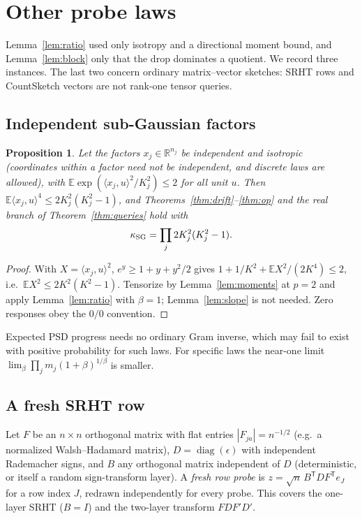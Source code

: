 \documentclass[11pt,a4paper]{article}
\newtheorem{proposition}[theorem]{Proposition}
\theoremstyle{definition}\newtheorem{definition}[theorem]{Definition}
\theoremstyle{remark}\newtheorem{remark}[theorem]{Remark}
\numberwithin{equation}{section}
\newcommand{\E}{\mathbb E}
\newcommand{\R}{\mathbb R}
\newcommand{\diag}{\operatorname{diag}}
\begin{document}
\section{Other probe laws}\label{sec:otherlaws}
Lemma~\ref{lem:ratio} used only isotropy and a directional moment bound, and
Lemma~\ref{lem:block} only that the drop dominates a quotient. We record three
instances. The last two concern ordinary matrix--vector sketches: SRHT rows and
CountSketch vectors are not rank-one tensor queries.

\subsection{Independent sub-Gaussian factors}
\begin{proposition}\label{prop:subgauss}
Let the factors $x_j\in\R^{n_j}$ be independent and isotropic (coordinates within
a factor need not be independent, and discrete laws are allowed), with
$\E\exp(\langle x_j,u\rangle^2/K_j^2)\le2$ for all unit $u$. Then
$\E\langle x_j,u\rangle^4\le2K_j^2(K_j^2-1)$, and Theorems~\ref{thm:drift}--\ref{thm:op}
and the real branch of Theorem~\ref{thm:queries} hold with
\[
 \kappa_{\rm SG}=\prod_j2K_j^2(K_j^2-1).
\]
\end{proposition}
\begin{proof}
With $X=\langle x_j,u\rangle^2$, $e^y\ge1+y+y^2/2$ gives
$1+1/K^2+\E X^2/(2K^4)\le2$, i.e.\ $\E X^2\le2K^2(K^2-1)$. Tensorize by
Lemma~\ref{lem:moments} at $p=2$ and apply Lemma~\ref{lem:ratio} with $\beta=1$;
Lemma~\ref{lem:slope} is not needed. Zero responses obey the $0/0$ convention.
\end{proof}
Expected PSD progress needs no ordinary Gram inverse, which may fail to exist
with positive probability for such laws. For specific laws the near-one limit
$\lim_\beta\prod_jm_j(1+\beta)^{1/\beta}$ is smaller.

\subsection{A fresh SRHT row}
Let $F$ be an $n\times n$ orthogonal matrix with flat entries
$|F_{ja}|=n^{-1/2}$ (e.g.\ a normalized Walsh--Hadamard matrix), $D=\diag(\epsilon)$
with independent Rademacher signs, and $B$ any orthogonal matrix independent of
$D$ (deterministic, or itself a random sign-transform layer). A \emph{fresh row
probe} is $z=\sqrt n\,B^{\mathsf T}DF^{\mathsf T}e_J$ for a row index $J$, redrawn
independently for every probe. This covers the one-layer SRHT ($B=I$) and the
two-layer transform $FDF'D'$.
\end{document}
